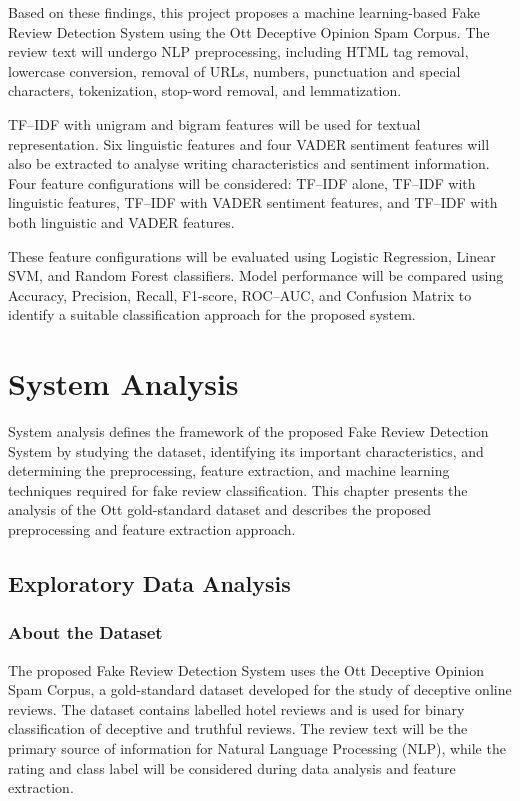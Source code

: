 \documentclass[12pt,a4paper]{report}
\begin{document}
Based on these findings, this project proposes a
machine learning-based Fake Review Detection System
using the Ott Deceptive Opinion Spam Corpus.
The review text will undergo NLP preprocessing,
including HTML tag removal, lowercase conversion,
removal of URLs, numbers, punctuation and special
characters, tokenization, stop-word removal,
and lemmatization.

TF--IDF with unigram and bigram features will be
used for textual representation. Six linguistic
features and four VADER sentiment features will
also be extracted to analyse writing characteristics
and sentiment information. Four feature configurations
will be considered: TF--IDF alone, TF--IDF with
linguistic features, TF--IDF with VADER sentiment
features, and TF--IDF with both linguistic and
VADER features.

These feature configurations will be evaluated
using Logistic Regression, Linear SVM, and Random
Forest classifiers. Model performance will be
compared using Accuracy, Precision, Recall,
F1-score, ROC--AUC, and Confusion Matrix to
identify a suitable classification approach
for the proposed system.

\newpage
\chapter{System Analysis}

System analysis defines the framework of the proposed Fake Review Detection System by studying the dataset, identifying its important characteristics, and determining the preprocessing, feature extraction, and machine learning techniques required for fake review classification. This chapter presents the analysis of the Ott gold-standard dataset and describes the proposed preprocessing and feature extraction approach.

\section{Exploratory Data Analysis}

\subsection{About the Dataset}

The proposed Fake Review Detection System uses the Ott Deceptive Opinion Spam Corpus, a gold-standard dataset developed for the study of deceptive online reviews. The dataset contains labelled hotel reviews and is used for binary classification of deceptive and truthful reviews. The review text will be the primary source of information for Natural Language Processing (NLP), while the rating and class label will be considered during data analysis and feature extraction.
\end{document}
